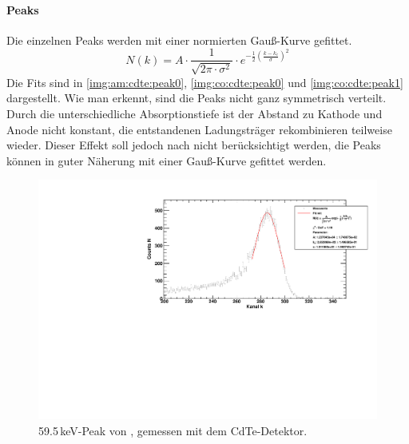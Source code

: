 \paragraph{Peaks}
Die einzelnen Peaks werden mit einer normierten Gauß-Kurve gefittet.
\begin{equation}
  \label{eq:part3:normgauss}
  N(k) = A \cdot \frac{1}{\sqrt{2\pi \cdot \sigma^2}} \cdot e^{-\frac{1}{2} \left( \frac{k-k_c}{\sigma} \right)^2}
\end{equation}
Die Fits sind in \autoref{img:am:cdte:peak0}, \autoref{img:co:cdte:peak0} und \autoref{img:co:cdte:peak1} dargestellt. Wie man erkennt, sind die 
Peaks nicht ganz symmetrisch verteilt. Durch die unterschiedliche Absorptionstiefe ist der Abstand zu Kathode und Anode nicht konstant, die 
entstandenen Ladungsträger rekombinieren teilweise wieder. Dieser Effekt soll jedoch nach \cite{staatsex} nicht berücksichtigt werden, die 
Peaks können in guter Näherung mit einer Gauß-Kurve gefittet werden.
\begin{figure}[H]
\begin{center}
  \includegraphics[width=\textwidth]{../img/part3/Am-CdTe_00.pdf}
  \caption{59.5\,keV-Peak von \am, gemessen mit dem CdTe-Detektor.}
  \label{img:am:cdte:peak0}
\end{center}
\end{figure}

